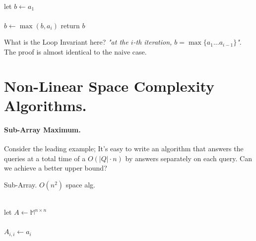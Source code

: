 \begin{example}
\begin{algorithm}[H]
{}
 \ \\ 
 let \(b \leftarrow a_1 \) \\ 
 \ \\ 
  { 
        \(b \leftarrow \max \left(b, a_i \right) \)
    } 
 return \( b \) 
 \caption{maximum alg.}
\end{algorithm}

What is the Loop Invariant here? \textit{"at the \(i\)-th iteration, \(b = \max{ \{ a_1 ... a_{i-1} \} } \)"}. The proof is almost identical to the naive case.   
\end{example}
\section{Non-Linear Space Complexity Algorithms. }
\paragraph{Sub-Array Maximum.} Consider the leading example; It's easy to write an algorithm that answers the queries at a total time of a \( O\left( |Q| \cdot n \right) \) by answers separately on each query. Can we achieve a better upper bound?

\begin{algbox}{Sub-Array. \(O(n^2)\) space alg.}
  \begin{algorithm}[H]
{}
 \ \\ 
 let \(A \leftarrow \mathbb{M}^{n\times n} \) \\ 
 \ \\ 
  {
    \( A_{i,i} \leftarrow a_i\)
 }
 \ \\
\ \\
\end{algorithm}
\end{algbox}

